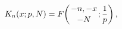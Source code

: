 \[\mathop{K_{n}\/}\nolimits\!\left(x;p,N\right)=\mathop{F\/}\nolimits\!\left({-n%
,-x\atop-N};\frac{1}{p}\right),\]